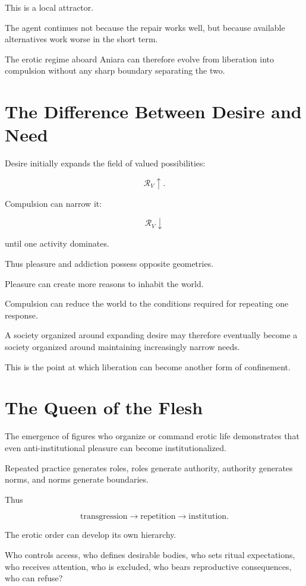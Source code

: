 \documentclass[11pt,oneside]{book}
\theoremstyle{definition}
\theoremstyle{remark}
\newcommand{\R}{\mathcal{R}}
\begin{document}
This is a local attractor.

The agent continues not because the repair works well, but because available alternatives work worse in the short term.

The erotic regime aboard Aniara can therefore evolve from liberation into compulsion without any sharp boundary separating the two.

\section{The Difference Between Desire and Need}

Desire initially expands the field of valued possibilities:

\[
\R_V\uparrow.
\]

Compulsion can narrow it:

\[
\R_V\downarrow
\]

until one activity dominates.

Thus pleasure and addiction possess opposite geometries.

Pleasure can create more reasons to inhabit the world.

Compulsion can reduce the world to the conditions required for repeating one response.

A society organized around expanding desire may therefore eventually become a society organized around maintaining increasingly narrow needs.

This is the point at which liberation can become another form of confinement.

\section{The Queen of the Flesh}

The emergence of figures who organize or command erotic life demonstrates that even anti-institutional pleasure can become institutionalized.

Repeated practice generates roles, roles generate authority, authority generates norms, and norms generate boundaries.

Thus

\[
\text{transgression}
\rightarrow
\text{repetition}
\rightarrow
\text{institution}.
\]

The erotic order can develop its own hierarchy.

Who controls access, who defines desirable bodies, who sets ritual expectations, who receives attention, who is excluded, who bears reproductive consequences, who can refuse?
\end{document}
